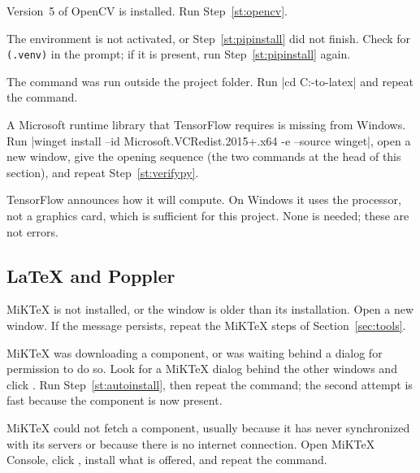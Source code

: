 \cause Version~5 of OpenCV is installed.
\remedy Run Step~\ref{st:opencv}.

\cause The environment is not activated, or Step~\ref{st:pipinstall} did not finish.
\remedy Check for \texttt{(.venv)} in the prompt; if it is present, run Step~\ref{st:pipinstall}
again.

\cause The command was run outside the project folder.
\remedy Run \code|cd C:\camera-to-latex| and repeat the command.

\cause A Microsoft runtime library that TensorFlow requires is missing from Windows.
\remedy Run \code|winget install --id Microsoft.VCRedist.2015+.x64 -e --source winget|, open a new
window, give the opening sequence (the two commands at the head of this section), and repeat
Step~\ref{st:verifypy}.

\cause TensorFlow announces how it will compute. On Windows it uses the processor, not a graphics
card, which is sufficient for this project.
\remedy None is needed; these are not errors.

\subsection{\LaTeX{} and Poppler}

\cause MiKTeX is not installed, or the window is older than its installation.
\remedy Open a new window. If the message persists, repeat the MiKTeX steps of
Section~\ref{sec:tools}.

\cause MiKTeX was downloading a component, or was waiting behind a dialog for permission to do so.
\remedy Look for a MiKTeX dialog behind the other windows and click . Run
Step~\ref{st:autoinstall}, then repeat the command; the second attempt is fast because the
component is now present.

\cause MiKTeX could not fetch a component, usually because it has never synchronized with its
servers or because there is no internet connection.
\remedy Open MiKTeX Console, click , install what is offered, and repeat the
command.

